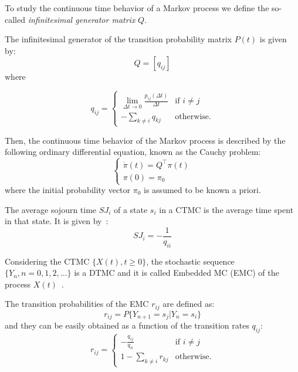 To study the continuous time behavior of a Markov process we define the so-called \emph{infinitesimal generator matrix} $Q$.
\begin{definition}
The infinitesimal generator of the transition probability matrix $P(t)$ is given by:
\begin{equation}
Q = \left[q_{ij}\right]
\end{equation}
where 

\begin{equation}
q_{ij}=
   \begin{cases}
   \displaystyle\lim_{\Delta t \to 0} \frac{p_{ij}(\Delta t)}{\Delta t}& \text{if } i \neq j\\
   - \displaystyle\sum_{k \neq i} q_{kj} & \text{otherwise}.
  \end{cases}
  \label{stoch:bg.eq.infGen}
\end{equation}
\end{definition}
Then, the continuous time behavior of the Markov process is described by the following ordinary differential equation, known as the Cauchy problem:
\begin{equation}
\begin{cases}
\dot \pi(t)=Q^\top\pi(t) \\
\pi(0)=\pi_0
\end{cases}
\label{stoch:bg.eq.cauchy}
\end{equation}
where the initial probability vector $\pi_0$ is assumed to be known a priori.
\begin{definition}
The average sojourn time $SJ_i$ of a state $s_i$ in a CTMC is the average time spent in that state. It is given by~\cite{stewart2009}:
\begin{equation}
SJ_i = -\frac{1}{q_{ii}}
\label{stoch:BG.eq.meansj}
\end{equation} 
\end{definition}
\begin{definition}
Considering the CTMC $\{X(t), t\geq 0 \}$, the stochastic sequence $\{Y_n, n = 0,1,2,\ldots\}$ is a DTMC and it is called Embedded MC (EMC) of the process $X(t)$~\cite{stewart2009}.
\end{definition}
The transition probabilities of the EMC $r_{ij}$ are defined as:
\begin{equation}
r_{ij} = P\{Y_{n+1} = s_j \vert Y_{n} = s_i\}
\end{equation}
and they can be easily obtained as a function of the transition rates $q_{ij}$:
\begin{equation}
r_{ij}=
   \begin{cases}
   -\frac{q_{ij}}{q_{ii}}& \text{if } i \neq j\\
    \displaystyle 1-\sum_{k \neq i} r_{kj} & \text{otherwise}.
  \end{cases}
\end{equation}
